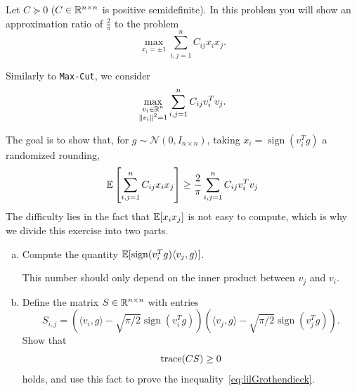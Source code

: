 \begin{myexercise}
    \label{prob:little_grothendieck}
    Let $C\succeq 0$ ($C \in \mathbb{R}^{n \times n}$ is positive semidefinite). In this problem you will show an approximation ratio of $\frac{2}{\pi}$ to the problem
\[
 \max_{x_i=\pm 1}\sum_{i,j=1}^n C_{ij}x_ix_j.
\]

Similarly to \texttt{Max-Cut}, we consider
\[
 \max_{\substack{v_i\in \mathbb{R}^n \\ \|v_i\|^2 = 1}}\sum_{i,j=1}^n C_{ij}v_i^Tv_j.
\]

The goal is to show that, for $ g \sim\mathcal{N}\left(0,I_{n\times n}\right)$, taking $x_i= \operatorname{sign}(v_i^T g)$ a randomized rounding,
\begin{equation}\label{eq:lilGrothendieck}
 \mathbb{E} \left[ \sum_{i,j=1}^n C_{ij}x_i x_j  \right] \geq \frac{2}{\pi} \sum_{i,j=1}^n C_{ij}v_i^Tv_j
\end{equation}
The difficulty lies in the fact that $\mathbb{E}[x_i x_j]$ is not easy to compute, which is why we divide this exercise into two parts.

\begin{enumerate}[(a)]
    \item Compute the quantity $\mathbb{E}[\operatorname{sign}(v_i^T g) \langle v_j, g \rangle]$.
    \begin{hint}
        This number should only depend on the inner product between $v_j$ and $v_i$.
    \end{hint}
    \item Define the matrix $S \in \mathbb{R}^{n \times n}$ with entries 
    $$S_{i,j} = (\langle v_i, g \rangle - \sqrt{\pi/2}\operatorname{sign}(v_i^T g))(\langle v_j, g \rangle - \sqrt{\pi/2}\operatorname{sign}(v_j^T g)).$$ Show that 
    $$ \operatorname{trace}(CS) \geq 0$$
    holds, and use this fact to prove the inequality~\eqref{eq:lilGrothendieck}.
\end{enumerate}
\end{myexercise}





